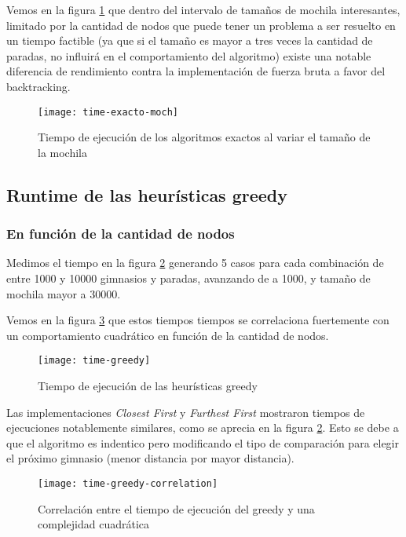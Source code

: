 Vemos en la figura \ref{fig:time-exacto-moch} que dentro del intervalo de tamaños de mochila
interesantes, limitado por la cantidad de nodos que puede tener un problema a ser resuelto en un tiempo factible
(ya que si el tamaño es mayor a tres veces la cantidad de paradas, no influirá en el comportamiento del algoritmo) existe una notable diferencia de rendimiento contra la implementación de fuerza bruta a favor del backtracking.

\begin{figure}[H]
    \centering
    \texttt{[image: time-exacto-moch]}
    \caption{Tiempo de ejecución de los algoritmos exactos al variar el tamaño de la mochila}
    \label{fig:time-exacto-moch}
\end{figure}

\subsection{Runtime de las heurísticas greedy}

\subsubsection{En función de la cantidad de nodos}

Medimos el tiempo en la figura \ref{fig:time-greedy} generando 5 casos para cada combinación de entre 1000 y 10000 gimnasios y paradas, avanzando de a 1000, y tamaño de mochila mayor a 30000.

Vemos en la figura \ref{fig:time-greedy-correlation} que estos tiempos tiempos se correlaciona fuertemente con un comportamiento cuadrático en función de la cantidad de nodos.

\begin{figure}[H]
    \centering
    \texttt{[image: time-greedy]}
    \caption{Tiempo de ejecución de las heurísticas greedy}
    \label{fig:time-greedy}
\end{figure}

Las implementaciones \emph{Closest First} y \emph{Furthest First} mostraron tiempos de ejecuciones notablemente similares, como se aprecia en la figura \ref{fig:time-greedy}. Esto se debe a que el algoritmo es indentico pero modificando el tipo de comparación para elegir el próximo gimnasio (menor distancia por mayor distancia).

\begin{figure}[H]
    \centering
    \texttt{[image: time-greedy-correlation]}
    \caption{Correlación entre el tiempo de ejecución del greedy y una complejidad cuadrática}
    \label{fig:time-greedy-correlation}
\end{figure}

